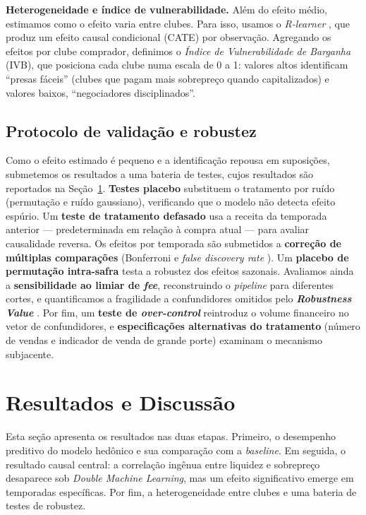 \documentclass[12pt]{article}
\begin{document}
\textbf{Heterogeneidade e índice de vulnerabilidade.} Além do efeito médio, estimamos como o efeito
varia entre clubes. Para isso, usamos o \textit{R-learner} \cite{nie2021}, que produz um efeito
causal condicional (CATE) por observação. Agregando os efeitos por clube comprador, definimos o
\textit{Índice de Vulnerabilidade de Barganha} (IVB), que posiciona cada clube numa escala de 0 a 1:
valores altos identificam ``presas fáceis'' (clubes que pagam mais sobrepreço quando capitalizados)
e valores baixos, ``negociadores disciplinados''.

\subsection{Protocolo de validação e robustez}

Como o efeito estimado é pequeno e a identificação repousa em suposições, submetemos os resultados a
uma bateria de testes, cujos resultados são reportados na Seção~\ref{sec:resultados}. \textbf{Testes
placebo} substituem o tratamento por ruído (permutação e ruído gaussiano), verificando que o modelo
não detecta efeito espúrio. Um \textbf{teste de tratamento defasado} usa a receita da temporada
anterior — predeterminada em relação à compra atual — para avaliar causalidade reversa. Os efeitos
por temporada são submetidos a \textbf{correção de múltiplas comparações} (Bonferroni e
\textit{false discovery rate} \cite{benjamini1995}). Um \textbf{placebo de permutação intra-safra}
testa a robustez dos efeitos sazonais. Avaliamos ainda a \textbf{sensibilidade ao limiar de
\textit{fee}}, reconstruindo o \textit{pipeline} para diferentes cortes, e quantificamos a
fragilidade a confundidores omitidos pelo \textbf{\textit{Robustness Value}} \cite{cinelli2020}.
Por fim, um \textbf{teste de \textit{over-control}} reintroduz o volume financeiro no vetor de
confundidores, e \textbf{especificações alternativas do tratamento} (número de vendas e indicador de
venda de grande porte) examinam o mecanismo subjacente.

\section{Resultados e Discussão}
\label{sec:resultados}

Esta seção apresenta os resultados nas duas etapas. Primeiro, o desempenho preditivo do modelo
hedônico e sua comparação com a \textit{baseline}. Em seguida, o resultado causal central: a
correlação ingênua entre liquidez e sobrepreço desaparece sob \textit{Double Machine Learning}, mas
um efeito significativo emerge em temporadas específicas. Por fim, a heterogeneidade entre clubes e
uma bateria de testes de robustez.
\end{document}
